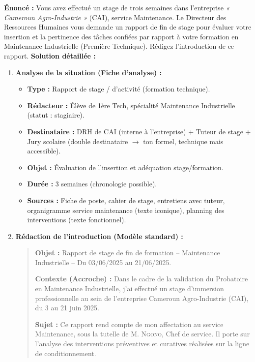 \documentclass[11pt]{article}
\begin{document}
\begin{exoresolu}
    \textbf{Énoncé :} Vous avez effectué un stage de trois semaines dans l'entreprise \emph{« Cameroun Agro-Industrie »} (CAI), service Maintenance. Le Directeur des Ressources Humaines vous demande un rapport de fin de stage pour évaluer votre insertion et la pertinence des tâches confiées par rapport à votre formation en Maintenance Industrielle (Première Technique). Rédigez l'introduction de ce rapport.
    \tcblower
    \textbf{Solution détaillée :}
    \begin{enumerate}
        \item \textbf{Analyse de la situation (Fiche d'analyse) :}
            \begin{itemize}
                \item \textbf{Type :} Rapport de stage / d'activité (formation technique).
                \item \textbf{Rédacteur :} Élève de 1ère Tech, spécialité Maintenance Industrielle (statut : stagiaire).
                \item \textbf{Destinataire :} DRH de CAI (interne à l'entreprise) + Tuteur de stage + Jury scolaire (double destinataire $\rightarrow$ ton formel, technique mais accessible).
                \item \textbf{Objet :} Évaluation de l'insertion et adéquation stage/formation.
                \item \textbf{Durée :} 3 semaines (chronologie possible).
                \item \textbf{Sources :} Fiche de poste, cahier de stage, entretiens avec tuteur, organigramme service maintenance (texte iconique), planning des interventions (texte fonctionnel).
            \end{itemize}
        \item \textbf{Rédaction de l'introduction (Modèle standard) :}
            \begin{quote}
                \textbf{Objet :} Rapport de stage de fin de formation – Maintenance Industrielle – Du 03/06/2025 au 21/06/2025.
                
                \textbf{Contexte (Accroche) :} Dans le cadre de la validation du Probatoire en Maintenance Industrielle, j'ai effectué un stage d'immersion professionnelle au sein de l'entreprise Cameroun Agro-Industrie (CAI), du 3 au 21 juin 2025.
                
                \textbf{Sujet :} Ce rapport rend compte de mon affectation au service Maintenance, sous la tutelle de M. \textsc{Ngono}, Chef de service. Il porte sur l'analyse des interventions préventives et curatives réalisées sur la ligne de conditionnement.
                

\end{quote}
\end{enumerate}
\end{exoresolu}
\end{document}
